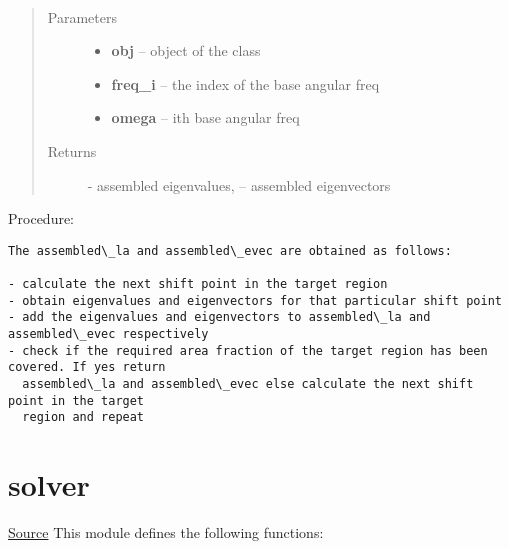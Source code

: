 \documentclass[letterpaper,10pt,english]{sphinxmanual}
\begin{document}
\begin{fulllineitems}
\label{index:brake.solve.qevp.brake_squeal_qevp}~\begin{quote}\begin{description}
\item[{Parameters}] \leavevmode\begin{itemize}
\item {} 
\textbf{obj} -- object of the class 

\item {} 
\textbf{freq\_i} -- the index of the base angular freq

\item {} 
\textbf{omega} -- ith base angular freq

\end{itemize}

\item[{Returns}] \leavevmode
{} - assembled eigenvalues,  -- assembled eigenvectors

\end{description}\end{quote}

Procedure:

\begin{Verbatim}[commandchars=\\\{\}]
The assembled\_la and assembled\_evec are obtained as follows:
  
- calculate the next shift point in the target region
- obtain eigenvalues and eigenvectors for that particular shift point
- add the eigenvalues and eigenvectors to assembled\_la and assembled\_evec respectively
- check if the required area fraction of the target region has been covered. If yes return
  assembled\_la and assembled\_evec else calculate the next shift point in the target
  region and repeat
\end{Verbatim}

\end{fulllineitems}



\section{solver}
\label{index:solver}
\href{https://bitbucket.org/akadar/brakesqueal0.1/src/master/brake/solve/solver.py?at=master}{Source}
\label{index:module-brake.solve.solver}
This module defines the following functions:
\end{document}
